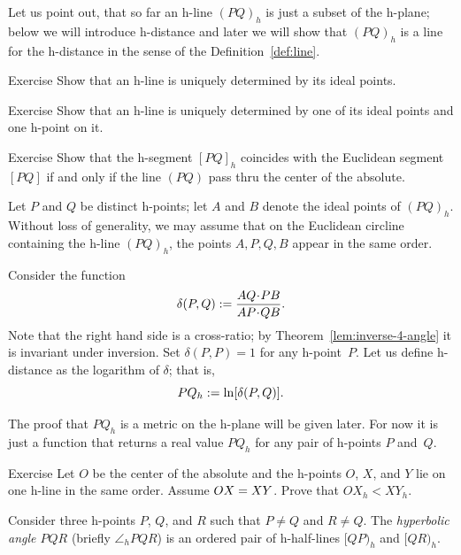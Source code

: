 Let us point out, that so far an h-line $(PQ)_h$ is just a subset of the h-plane;
below we will introduce h-distance 
and later we will show that $(PQ)_h$ is a line for the h-distance in the sense of the Definition~\ref{def:line}. 

\begin{thm}{Exercise}\label{ex:ideal-line-unique}
Show that an h-line is uniquely determined by its ideal points.
\end{thm}

\begin{thm}{Exercise}\label{ex:1ideal-line-unique}
Show that an h-line is uniquely determined by one of its ideal points and one h-point on it.
\end{thm}

\begin{thm}{Exercise}\label{ex:line/h-line}
Show that the h-segment $[PQ]_h$ coincides with the Euclidean segment $[PQ]$
if and only if the line $(PQ)$ pass thru the center of the absolute.
\end{thm}

\label{h-dist}
Let $P$ and $Q$ be distinct h-points;
let $A$ and $B$ denote the ideal points of $(PQ)_h$.
Without loss of generality, we may assume that on the Euclidean circline containing the h-line $(PQ)_h$, the points $A,P,Q,B$ appear in the same order.

Consider the function 
$$\delta(P,Q)\df\frac{AQ\cdot PB}{AP\cdot QB}.$$
Note that the right hand side is a cross-ratio;
by Theorem~\ref{lem:inverse-4-angle} it is invariant under inversion.
Set $\delta(P,P)=1$ for any h-point~$P$.
Let us define h-distance as the logarithm of $\delta$; that is,
$$PQ_h:=\ln[\delta(P,Q)].$$

The proof that $PQ_h$ is a metric on the h-plane will be given later.
For now it is just a function that returns a real value $PQ_h$ for any pair of h-points $P$ and~$Q$.

\begin{thm}{Exercise}\label{ex:h-dist-eq}
Let $O$ be the center of the absolute and the h-points $O$, $X$, and $Y$ lie on one h-line in the same order.
Assume $OX\z=XY$.
Prove that $OX_h<XY_h$.
\end{thm}


\label{h-angle measure}
Consider three h-points $P$, $Q$, and $R$
such that $P\ne Q$ and $R\ne Q$.
The \emph{hyperbolic angle $PQR$} (briefly $\angle_h PQR$) is an ordered pair of h-half-lines $[QP)_h$ and $[QR)_h$.

